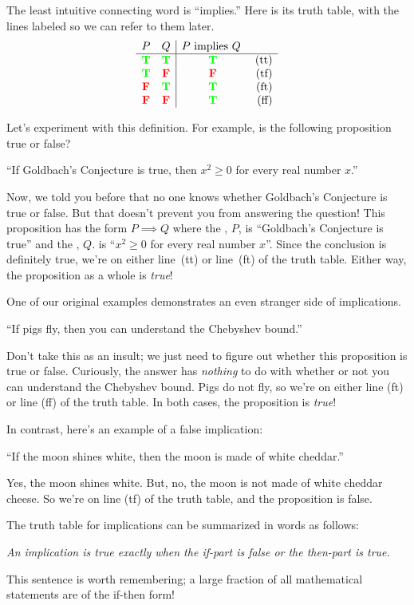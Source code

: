 The least intuitive connecting word is ``implies.''  Here is its truth
table, with the lines labeled so we can refer to them later.
%
\[
\begin{array}{cc|cr}
    P  &   Q    & \parbox[b]{13ex}{$P$ implies $Q$} \\ \hline
\true  & \true  & \true & \text{(tt)}\\
\true  & \false & \false  & \text{(tf)}\\
\false & \true  & \true  & \text{(ft)}\\
\false & \false & \true  & \text{(ff)}
\end{array}
\]

Let's experiment with this definition.  For example, is the following
proposition true or false?
%
\begin{center}
``If Goldbach's Conjecture is true, then $x^2 \geq 0$ for every real
number $x$.''
\end{center}
%
Now, we told you before that no one knows whether Goldbach's Conjecture is
true or false.  But that doesn't prevent you from answering the question!
This proposition has the form $P \implies Q$ where the ,
$P$, is ``Goldbach's Conjecture is true'' and the , $Q$.
is ``$x^2 \geq 0$ for every real number $x$''.  Since the conclusion is
definitely true, we're on either line~(tt) or line~(ft) of the truth
table.  Either way, the proposition as a whole is \textit{true}!

One of our original examples demonstrates an even stranger side of
implications.
%
\begin{center}
``If pigs fly, then you can understand the Chebyshev bound.''
\end{center}
%
Don't take this as an insult; we just need to figure out whether this
proposition is true or false.  Curiously, the answer has \textit{nothing}
to do with whether or not you can understand the Chebyshev bound.  Pigs do
not fly, so we're on either line (ft) or line (ff) of the truth table.  In
both cases, the proposition is \textit{true}!

In contrast, here's an example of a false implication:
%
\begin{center}
``If the moon shines white, then the moon is made of white cheddar.''
\end{center}
%
Yes, the moon shines white.  But, no, the moon is not made of white
cheddar cheese.  So we're on line (tf) of the truth table, and the
proposition is false.

The truth table for implications can be summarized in words as
follows:
%
\begin{center}
\textit{An implication is true exactly when the if-part is false or the
then-part is true.}
\end{center}
%
This sentence is worth remembering; a large fraction of all
mathematical statements are of the if-then form!

